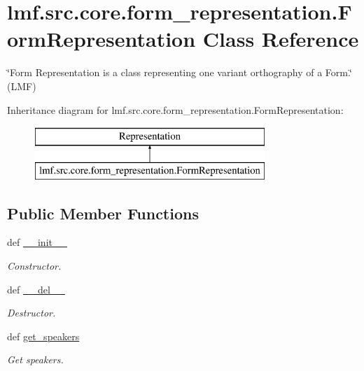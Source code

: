 \hypertarget{classlmf_1_1src_1_1core_1_1form__representation_1_1_form_representation}{\section{lmf.\+src.\+core.\+form\+\_\+representation.\+Form\+Representation Class Reference}
\label{classlmf_1_1src_1_1core_1_1form__representation_1_1_form_representation}
}


\char`\"{}\+Form Representation is a class representing one variant orthography of a Form.\char`\"{} (L\+M\+F)  


Inheritance diagram for lmf.\+src.\+core.\+form\+\_\+representation.\+Form\+Representation\+:\begin{figure}[H]
\begin{center}
\leavevmode
\includegraphics[height=2.000000cm]{classlmf_1_1src_1_1core_1_1form__representation_1_1_form_representation}
\end{center}
\end{figure}
\subsection*{Public Member Functions}
\begin{DoxyCompactItemize}
\item 
def \hyperlink{classlmf_1_1src_1_1core_1_1form__representation_1_1_form_representation_ab034318ab1492fac033d745860e18a37}{\+\_\+\+\_\+init\+\_\+\+\_\+}
\begin{DoxyCompactList}\small\item\em Constructor. \end{DoxyCompactList}\item 
def \hyperlink{classlmf_1_1src_1_1core_1_1form__representation_1_1_form_representation_a577b5258bf8f64ff889f0588cf0c8eda}{\+\_\+\+\_\+del\+\_\+\+\_\+}
\begin{DoxyCompactList}\small\item\em Destructor. \end{DoxyCompactList}\item 
def \hyperlink{classlmf_1_1src_1_1core_1_1form__representation_1_1_form_representation_a348d8eb39ef5bda7789106c9f5fe7755}{get\+\_\+speakers}
\begin{DoxyCompactList}\small\item\em Get speakers. \end{DoxyCompactList}\end{DoxyCompactItemize}
